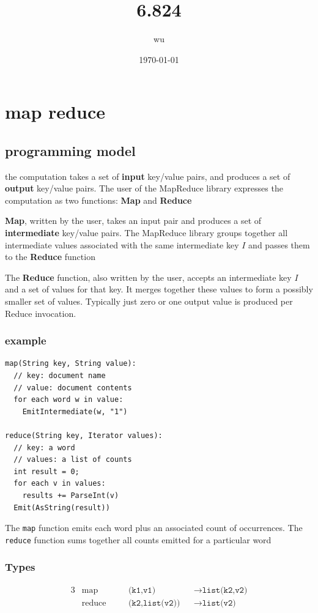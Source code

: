 \documentclass[11pt]{article}
\author{wu}
\date{\today}
\title{6.824}
\begin{document}
\maketitle
\tableofcontents


\section{map reduce}
\label{sec:orgf7a5902}

\subsection{programming model}
\label{sec:orgcd26db0}
the computation takes a set of \textbf{input} key/value pairs, and produces a set of \textbf{output} key/value
pairs. The user of the MapReduce library expresses the computation as two functions: \textbf{Map} and
\textbf{Reduce}

\textbf{Map}, written by the user, takes an input pair and produces a set of \textbf{intermediate} key/value
pairs. The MapReduce library groups together all intermediate values associated with the same
intermediate key \(I\) and passes them to the \textbf{Reduce} function

The \textbf{Reduce} function, also written by the user, accepts an intermediate key \(I\)  and a set of
values for that key. It merges together these values to form a possibly smaller set of values.
Typically just zero or one output value is produced per Reduce invocation.

\subsubsection{example}
\label{sec:orga84ad4f}
\begin{verbatim}
map(String key, String value):
  // key: document name
  // value: document contents
  for each word w in value:
    EmitIntermediate(w, "1")

reduce(String key, Iterator values):
  // key: a word
  // values: a list of counts
  int result = 0;
  for each v in values:
    results += ParseInt(v)
  Emit(AsString(result))
\end{verbatim}
The \texttt{map} function emits each word plus an associated count of occurrences. The \texttt{reduce} function
sums together all counts emitted for a particular word

\subsubsection{Types}
\label{sec:org4f2e030}
\begin{alignat*}{3}
&\text{map}&&\texttt{(k1,v1)}&&\to\texttt{list(k2,v2)}\\
&\text{reduce}\quad&&\texttt{(k2,list(v2))}&&\to\texttt{list(v2)}\\
\end{alignat*}
\end{document}
